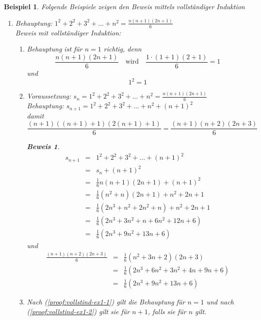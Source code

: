 \documentclass{report}
\newtheorem{myexample}{Beispiel}
\newtheorem{myproof}{Beweis}
\begin{document}
\begin{myexample}Folgende Beispiele zeigen den Beweis mittels vollständiger Induktion\begin{enumerate}
\item Behauptung: $1^2 + 2^2 + 3^2 + ... + n^2 = \frac{n(n+1)(2n+1)}{6}$\\
Beweis mit vollständiger Induktion:
\begin{enumerate}
\item \label{proof:vollstind-ex1-1} Behauptung ist für $n=1$ richtig, denn 
\begin{equation}\frac{n(n+1)(2n+1)}{6} \quad \mbox{wird} \quad \frac{1 \cdot (1+1)(2 + 1)}{6} = 1\end{equation} und
\begin{equation}1^2 = 1\end{equation}
\item \label{proof:vollstind-ex1-2} Voraussetzung: $s_n = 1^2 + 2^2 + 3^2 + ... + n^2 = \frac{n(n+1)(2n+1)}{6}$\\
Behauptung: $s_{n+1} = 1^2 + 2^2 + 3^2 + ... + n^2 + (n+1)^2$\\
damit \begin{equation}\frac{(n+1)((n+1)+1)(2(n+1)+1)}{6} = \frac{(n+1)(n+2)(2n+3)}{6}\end{equation}
\begin{myproof}
\begin{eqnarray}s_{n+1} & = & 1^2 + 2^2 + 3^2 + ... + (n+1)^2\nonumber \\
& = & s_n + (n+1)^2 \nonumber \\
& = & \frac{1}{6} n (n+1)(2n+1)+(n+1)^2 \nonumber \\
& = & \frac{1}{6} (n^2 + n)(2n+1) + n^2 + 2n +1 \nonumber \\
& = & \frac{1}{6} (2n^3 + n^2 + 2n^2 + n) + n^2 + 2n + 1 \nonumber \\
& = & \frac{1}{6} (2n^3 + 3n^2 + n + 6n^2 + 12n + 6) \nonumber \\
& = & \frac{1}{6} (2n^3 + 9n^2 + 13n + 6)\end{eqnarray}
und
\begin{eqnarray}\frac{(n+1)(n+2)(2n+3)}{6} & = & \frac{1}{6} (n^2 + 3n + 2)(2n + 3) \nonumber \\
& = & \frac{1}{6} (2n^3 + 6n^2 + 3n^2 + 4n + 9n +6) \nonumber \\
& = & \frac{1}{6} (2n^3 + 9n^2 + 13n + 6)\end{eqnarray}
\end{myproof}
\item Nach (\ref{proof:vollstind-ex1-1}) gilt die Behauptung für $n = 1$ und nach (\ref{proof:vollstind-ex1-2}) gilt sie für $n+1$, falls sie für $n$ gilt.\\

\end{enumerate}
\end{enumerate}
\end{myexample}
\end{document}
